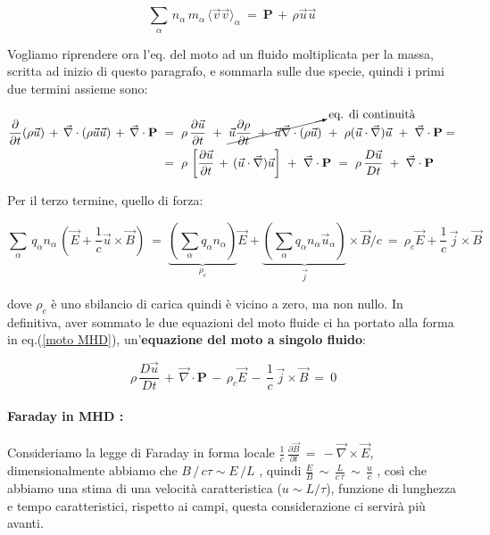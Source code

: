 \[ \sum_\alpha\, n_\alpha\, m_\alpha\, \langle \vec v \vec v \rangle_\alpha\ =\ \mathbf{P}\, +\, \rho \vec u \vec u\]

Vogliamo riprendere ora l'eq. del moto ad un fluido moltiplicata per la massa, scritta ad inizio di questo paragrafo, e sommarla sulle due specie, quindi i primi due termini assieme sono:



\[\begin{aligned} \frac{\partial}{\partial t} (\rho\vec u)\, +\, \vec \nabla\cdot (\rho\vec u\vec u)\, +\, \vec \nabla \cdot \mathbf{P}\ 
&=\ \rho\,  \frac{\partial \vec u}{\partial t}\ +\ \cancelto{\text{eq. di continuità}}{\vec u  \frac{\partial\rho}{\partial t}\ +\ \vec u\vec\nabla\cdot (\rho\vec u)}\ +\ \rho(\vec u\cdot \vec \nabla)\vec u\ +\ \vec \nabla \cdot \mathbf{P} = \\ 
&=\ \rho \, \left[ \frac{\partial\vec u}{\partial t}\, +\, (\vec u\cdot \vec \nabla)\vec u \right]\ +\ \vec \nabla \cdot \mathbf{P}
\ =\ \rho\, \frac{D\vec u}{Dt}\ +\ \vec \nabla \cdot \mathbf{P}\end{aligned}\]

Per il terzo termine, quello di forza:

\[\sum_\alpha\, q_\alpha n_\alpha\, \left(\vec E + \frac{1}{c}\vec u\times \vec B\right)\ =\ \underset{\rho_c}{\underbrace{\left(\sum_\alpha q_\alpha n_\alpha \right) }} \vec E + \underset{\vec j}{\underbrace{\left( \sum_\alpha q_\alpha n_\alpha \vec u_\alpha \right)}}\times \vec B/c\ =\  \rho_c \vec E + \frac{1}{c}\,\vec j\times \vec B\]

dove $\rho_c$ è uno sbilancio di carica quindi è vicino a zero, ma non nullo. In definitiva, aver sommato le due equazioni del moto fluide ci ha portato alla forma in eq.(\ref{moto MHD}), un'\textbf{equazione del moto a singolo fluido}:

\begin{equation}\label{moto MHD}
	\boxed{\ \rho\, \frac{D \vec u}{D t}\, +\, \vec\nabla\cdot\mathbf{P} \,-\, \rho_c \vec E\, -\, \frac{1}{c}\,\vec j\times \vec B\ =\ 0}
\end{equation}

%
%
\vspace{0.5cm}
\paragraph{Faraday in MHD : } 

Consideriamo la legge di Faraday in forma locale $\frac{1}{c}\, \frac{\partial \vec B}{\partial t}\, =\, -\vec \nabla \times \vec E$, dimensionalmente abbiamo che $B\, /\, c\tau \sim E\, / L$ , quindi $\frac{E}{B}\, \sim\, \frac{L}{c\, \tau}\,\sim\, \frac{u}{c}$ , così che abbiamo una stima di una velocità caratteristica ($u\sim L/\tau$), funzione di lunghezza e tempo caratteristici, rispetto ai campi, questa considerazione ci servirà più avanti.

